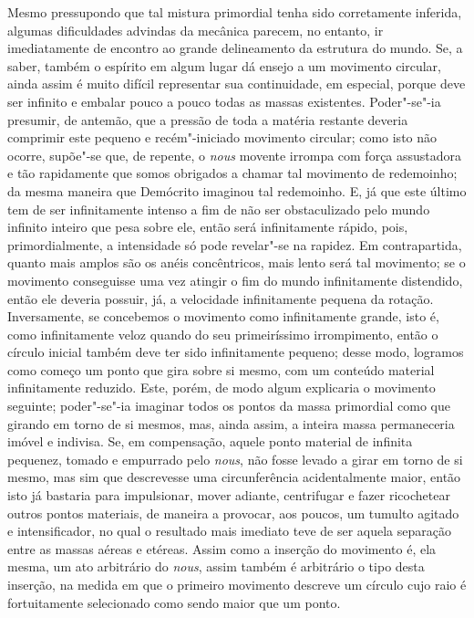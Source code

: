 Mesmo pressupondo que tal mistura primordial tenha sido corretamente
inferida, algumas dificuldades advindas da mecânica parecem, no
entanto, ir imediatamente de encontro ao grande delineamento da
estrutura do mundo. Se, a saber, também o espírito em algum lugar dá ensejo
a um movimento circular, ainda assim é muito difícil representar sua
continuidade, em especial, porque deve ser infinito e embalar pouco a
pouco todas as massas existentes. Poder"-se"-ia presumir, de antemão, que
a pressão de toda a matéria restante deveria comprimir este pequeno e
recém"-iniciado movimento circular; como isto não ocorre, supõe"-se que,
de repente, o \textit{nous} movente irrompa com força assustadora e tão
rapidamente que somos obrigados a chamar tal movimento de redemoinho;
da mesma maneira que Demócrito imaginou tal redemoinho. E, já que
este último tem de ser infinitamente intenso a fim de não ser
obstaculizado pelo mundo infinito inteiro que pesa sobre ele, então
será infinitamente rápido, pois, primordialmente, a intensidade só pode
revelar"-se na rapidez. Em contrapartida, quanto mais amplos são os
anéis concêntricos, mais lento será tal movimento; se o movimento
conseguisse uma vez atingir o fim do mundo infinitamente distendido,
então ele deveria possuir, já, a velocidade infinitamente pequena da
rotação. Inversamente, se concebemos o movimento como infinitamente
grande, isto é, como infinitamente veloz quando do seu primeiríssimo
irrompimento, então o círculo inicial também deve ter sido
infinitamente pequeno; desse modo, logramos como começo um ponto que
gira sobre si mesmo, com um conteúdo material infinitamente reduzido.
Este, porém, de modo algum explicaria o movimento seguinte; poder"-se"-ia
imaginar todos os pontos da massa primordial como que girando em torno
de si mesmos, mas, ainda assim, a inteira massa permaneceria imóvel e
indivisa. Se, em compensação, aquele ponto material de infinita
pequenez, tomado e empurrado pelo \textit{nous}, não fosse levado a
girar em torno de si mesmo, mas sim que descrevesse uma circunferência
acidentalmente maior, então isto já bastaria para impulsionar, mover
adiante, centrifugar e fazer ricochetear outros pontos materiais, de
maneira a provocar, aos poucos, um tumulto agitado e intensificador, no
qual o resultado mais imediato teve de ser aquela separação entre as
massas aéreas e etéreas. Assim como a inserção do movimento é, ela
mesma, um ato arbitrário do \textit{nous}, assim também é arbitrário o
tipo desta inserção, na medida em que o primeiro movimento descreve um
círculo cujo raio é fortuitamente selecionado como sendo maior que um ponto.

